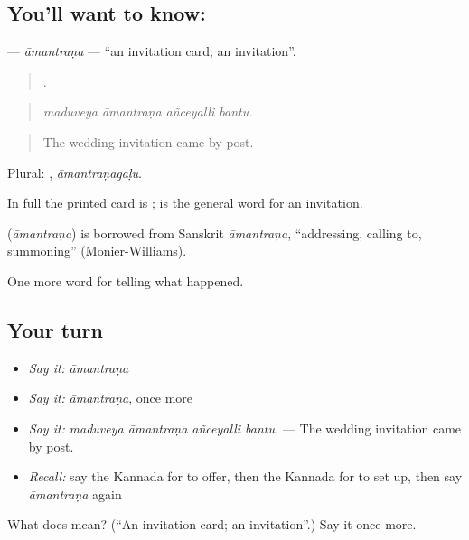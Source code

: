 \subsection*{You'll want to know: }
\textbf{} — \emph{āmantraṇa} — \textquotedblleft{}an invitation card; an invitation\textquotedblright{}.

\begin{quote}
   .
\end{quote}

\begin{quote}
\emph{maduveya āmantraṇa añceyalli bantu.}
\end{quote}

\begin{quote}
The wedding invitation came by post.
\end{quote}

Plural: , \emph{āmantraṇagaḷu}.

In full the printed card is  ;  is the general word for an invitation.

\begin{cousinweb}
\textbf{} (\emph{āmantraṇa}) is borrowed from Sanskrit \emph{āmantraṇa}, \textquotedblleft{}addressing, calling to, summoning\textquotedblright{} (Monier-Williams).
\end{cousinweb}

\begin{grammarlens}[title={What you've built}]
One more word for telling what happened.
\end{grammarlens}

\subsection*{Your turn}
\begin{itemize}
\raggedright
  \item \emph{Say it:} \emph{āmantraṇa}
  \item \emph{Say it:} \emph{āmantraṇa}, once more
  \item \emph{Say it:} \emph{maduveya āmantraṇa añceyalli bantu.} — The wedding invitation came by post.
  \item \emph{Recall:} say the Kannada for to offer, then the Kannada for to set up, then say \emph{āmantraṇa} again
\end{itemize}

\begin{tcolorbox}[breakable,colback=teal!4,colframe=teal!35!black,title={Before you move on}]
What does  mean? (\textquotedblleft{}An invitation card; an invitation\textquotedblright{}.) Say it once more.
\end{tcolorbox}
